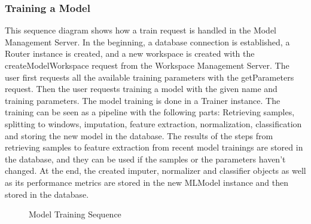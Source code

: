 \subsubsection{Training a Model}
This sequence diagram shows how a train request is handled in the Model Management Server. In the beginning, a database connection is established, a Router instance is created, and a new workspace is created with the createModelWorkspace request from the Workspace Management Server.
The user first requests all the available training parameters with the getParameters request. Then the user requests training a model with the given name and training parameters. The model training is done in a Trainer instance. The training can be seen as a pipeline with the following parts: Retrieving samples, splitting to windows, imputation, feature extraction, normalization, classification and storing the new model in the database. The results of the steps from retrieving samples to feature extraction from recent model trainings are stored in the database, and they can be used if the samples or the parameters haven't changed. At the end, the created imputer, normalizer and classifier objects as well as its performance metrics are stored in the new MLModel instance and then stored in the database.
\begin{figure}[!htb]
    \centering
    \caption{Model Training Sequence}
    \label{fig:seq-training-a-model}
\end{figure}


